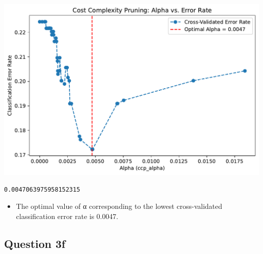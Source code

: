 \documentclass[
  letterpaper,
  DIV=11,
  numbers=noendperiod]{scrartcl}
\providecommand{\tightlist}{%
  \setlength{\itemsep}{0pt}\setlength{\parskip}{0pt}}\usepackage{longtable,booktabs,array}
\begin{document}
\includegraphics{PS4_files/figure-pdf/cell-15-output-1.pdf}

\begin{verbatim}
0.0047063975958152315
\end{verbatim}

\begin{itemize}
\tightlist
\item
  The optimal value of α corresponding to the lowest cross-validated
  classification error rate is 0.0047.
\end{itemize}

\subsection{Question 3f}\label{question-3f}
\end{document}
